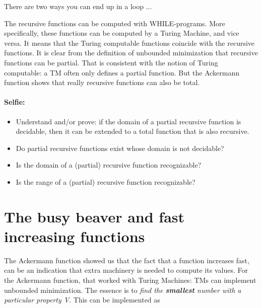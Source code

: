 There are two ways you can end up in a loop ...




The recursive functions can be computed with WHILE-programs. More
specifically, these functions can be computed by a Turing Machine, and
vice versa. It means that the Turing computable functions coincide with
the recursive functions. It is clear from the definition of unbounded
minimization that recursive functions can be partial. That is
consistent with the notion of Turing computable: a TM often only defines 
a partial function. But the Ackermann function shows that really
recursive functions can also be total.


\paragraph{Selfie:}
\begin{itemize}
\item[]
Understand and/or prove: if the domain of a partial recursive function
is decidable, then it can be extended to a total function that is also
recursive.
\item[]
Do partial recursive functions exist whose domain is not decidable?
\item[]
Is the domain of a (partial) recursive function recognizable?
\item[]
Is the range of a (partial) recursive function recognizable?
\end{itemize}

\clearpage


\section{The busy beaver and fast increasing functions}

The Ackermann function showed us that the fact that a function
increases fast, can be an indication that extra machinery is needed to
compute its values. For the Ackermann function, that worked with
Turing Machines: TMs can implement unbounded minimization. The essence
is to {\em find the {\bf smallest} number with a particular property
  V}. This can be implemented as

